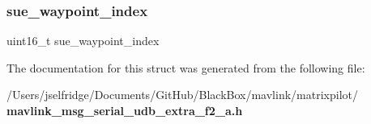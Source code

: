 \mbox{\label{struct____mavlink__serial__udb__extra__f2__a__t_a583984c614871ef246e17f1ee52c271f}} 
\subsubsection{sue\+\_\+waypoint\+\_\+index}
{\footnotesize\ttfamily uint16\+\_\+t sue\+\_\+waypoint\+\_\+index}



The documentation for this struct was generated from the following file\+:\begin{DoxyCompactItemize}
\item 
/\+Users/jselfridge/\+Documents/\+Git\+Hub/\+Black\+Box/mavlink/matrixpilot/\textbf{ mavlink\+\_\+msg\+\_\+serial\+\_\+udb\+\_\+extra\+\_\+f2\+\_\+a.\+h}\end{DoxyCompactItemize}
